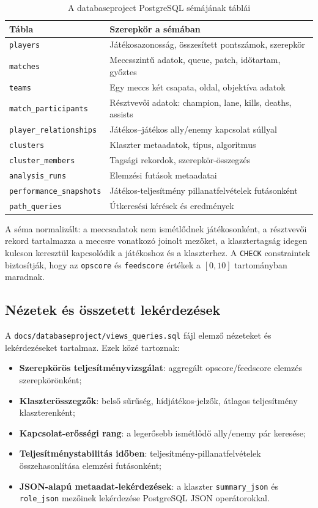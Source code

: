 ﻿\documentclass[a4paper,12pt]{report}
\begin{document}
\begin{table}[H]
\centering
\caption{A databaseproject PostgreSQL sémájának táblái}
\begin{tabularx}{\textwidth}{>{\raggedright\arraybackslash}p{4.5cm}X}
\toprule
\textbf{Tábla} & \textbf{Szerepkör a sémában} \\
\midrule
\texttt{players} & Játékosazonosság, összesített pontszámok, szerepkör \\
\texttt{matches} & Meccsszintű adatok, queue, patch, időtartam, győztes \\
\texttt{teams} & Egy meccs két csapata, oldal, objektíva adatok \\
\texttt{match\_participants} & Résztvevői adatok: champion, lane, kills, deaths, assists \\
\texttt{player\_relationships} & Játékos--játékos ally/enemy kapcsolat súllyal \\
\texttt{clusters} & Klaszter metaadatok, típus, algoritmus \\
\texttt{cluster\_members} & Tagsági rekordok, szerepkör-összegzés \\
\texttt{analysis\_runs} & Elemzési futások metaadatai \\
\texttt{performance\_snapshots} & Játékos-teljesítmény pillanatfelvételek futásonként \\
\texttt{path\_queries} & Útkeresési kérések és eredmények \\
\bottomrule
\end{tabularx}
\end{table}

A séma normalizált: a meccsadatok nem ismétlődnek játékosonként, a résztvevői rekord tartalmazza a meccsre vonatkozó joinolt mezőket, a klasztertagság idegen kulcson keresztül kapcsolódik a játékoshoz és a klaszterhez. A \texttt{CHECK} constraintek biztosítják, hogy az \texttt{opscore} és \texttt{feedscore} értékek a $[0,10]$ tartományban maradnak.

\subsection{Nézetek és összetett lekérdezések}

A \texttt{docs/databaseproject/views\_queries.sql} fájl elemző nézeteket és lekérdezéseket tartalmaz. Ezek közé tartoznak:
\begin{itemize}
    \item \textbf{Szerepkörös teljesítményvizsgálat}: aggregált opscore/feedscore elemzés szerepkörönként;
    \item \textbf{Klaszterösszegzők}: belső sűrűség, hídjátékos-jelzők, átlagos teljesítmény klaszterenként;
    \item \textbf{Kapcsolat-erősségi rang}: a legerősebb ismétlődő ally/enemy pár keresése;
    \item \textbf{Teljesítménystabilitás időben}: teljesítmény-pillanatfelvételek összehasonlítása elemzési futásonként;
    \item \textbf{JSON-alapú metaadat-lekérdezések}: a klaszter \texttt{summary\_json} és \texttt{role\_json} mezőinek lekérdezése PostgreSQL JSON operátorokkal.
\end{itemize}
\end{document}

